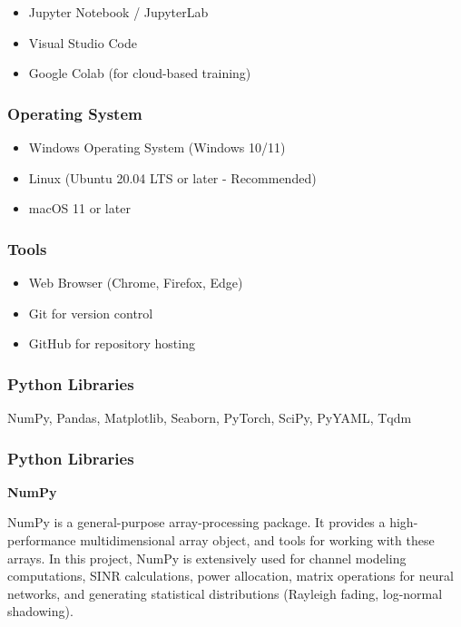 \documentclass[12pt,a4paper]{article}
\begin{document}
\begin{itemize}
    \item Jupyter Notebook / JupyterLab
    \item Visual Studio Code
    \item Google Colab (for cloud-based training)
\end{itemize}

\subsubsection{Operating System}

\begin{itemize}
    \item Windows Operating System (Windows 10/11)
    \item Linux (Ubuntu 20.04 LTS or later - Recommended)
    \item macOS 11 or later
\end{itemize}

\subsubsection{Tools}

\begin{itemize}
    \item Web Browser (Chrome, Firefox, Edge)
    \item Git for version control
    \item GitHub for repository hosting
\end{itemize}

\subsubsection{Python Libraries}

NumPy, Pandas, Matplotlib, Seaborn, PyTorch, SciPy, PyYAML, Tqdm

\subsubsection{Python Libraries}

\textbf{NumPy}

NumPy is a general-purpose array-processing package. It provides a high-performance multidimensional array object, and tools for working with these arrays. In this project, NumPy is extensively used for channel modeling computations, SINR calculations, power allocation, matrix operations for neural networks, and generating statistical distributions (Rayleigh fading, log-normal shadowing).
\end{document}
